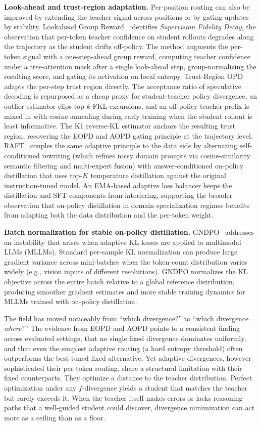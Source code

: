 \documentclass{article} %
\begin{document}
\textbf{Look-ahead and trust-region adaptation.} Per-position routing can also be improved by extending the teacher signal across positions or by gating updates by stability. Lookahead Group Reward~\citep{2605.30833} identifies \emph{Supervision Fidelity Decay}, the observation that per-token teacher confidence on student rollouts degrades along the trajectory as the student drifts off-policy. The method augments the per-token signal with a one-step-ahead group reward, computing teacher confidence under a tree-attention mask after a single look-ahead step, group-normalizing the resulting score, and gating its activation on local entropy. Trust-Region OPD~\citep{2606.01249} adapts the per-step trust region directly. The acceptance ratio of speculative decoding is repurposed as a cheap proxy for student-teacher policy divergence, an outlier estimator clips top-$k$ FKL excursions, and an off-policy teacher prefix is mixed in with cosine annealing during early training when the student rollout is least informative. The K1 reverse-KL estimator anchors the resulting trust region, recovering the EOPD and AOPD gating principle at the trajectory level. RAFT~\citep{2606.00147} couples the same adaptive principle to the data side by alternating self-conditioned rewriting (which refines noisy domain prompts via cosine-similarity semantic filtering and multi-expert fusion) with answer-conditioned on-policy distillation that uses top-$K$ temperature distillation against the original instruction-tuned model. An EMA-based adaptive loss balancer keeps the distillation and SFT components from interfering, supporting the broader observation that on-policy distillation in domain specialization regimes benefits from adapting both the data distribution and the per-token weight.

\textbf{Batch normalization for stable on-policy distillation.} GNDPO~\citep{2606.09091} addresses an instability that arises when adaptive KL losses are applied to multimodal LLMs (MLLMs). Standard per-sample KL normalization can produce large gradient variance across mini-batches when the token-count distribution varies widely (e.g., vision inputs of different resolutions). GNDPO normalizes the KL objective across the entire batch relative to a global reference distribution, producing smoother gradient estimates and more stable training dynamics for MLLMs trained with on-policy distillation.

The field has moved noticeably from ``which divergence?'' to ``which divergence \emph{where}?'' The evidence from EOPD and AOPD points to a consistent finding across evaluated settings, that no single fixed divergence dominates uniformly, and that even the simplest adaptive routing (a hard entropy threshold) often outperforms the best-tuned fixed alternative. Yet adaptive divergences, however sophisticated their per-token routing, share a structural limitation with their fixed counterparts. They optimize a distance to the teacher distribution. Perfect optimization under any $f$-divergence yields a student that matches the teacher but rarely exceeds it. When the teacher itself makes errors or lacks reasoning paths that a well-guided student could discover, divergence minimization can act more as a ceiling than as a floor.
\end{document}
